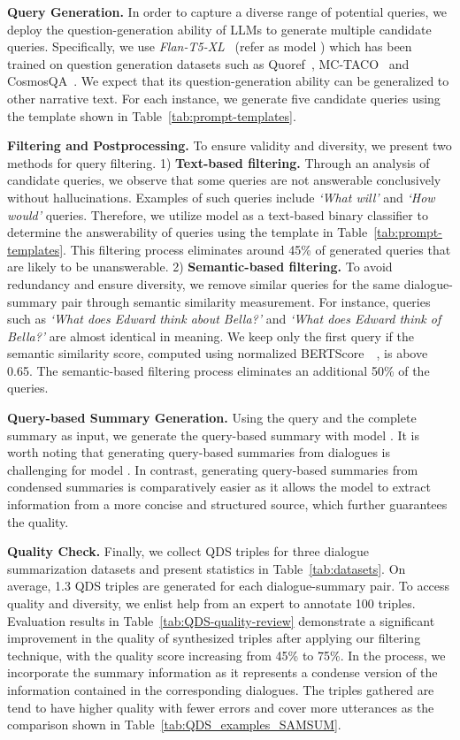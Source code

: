 \documentclass[11pt]{article}
\begin{document}
        \textbf{Query Generation.} In order to capture a diverse range of potential queries, we deploy the question-generation ability of LLMs to generate multiple candidate queries. Specifically, we use \emph{Flan-T5-XL}~\cite{chung2022scaling} (refer as model ) which has been trained on question generation datasets such as Quoref~\cite{dasigi-etal-2019-quoref}, MC-TACO~\cite{zhou-etal-2019-going} and CosmosQA~\cite{huang-etal-2019-cosmos}. We expect that its question-generation ability can be generalized to other narrative text. For each instance, we generate five candidate queries using the template shown in Table~\ref{tab:prompt-templates}.

        \textbf{Filtering and Postprocessing.} To ensure validity and diversity, we present two methods for query filtering. 1) \textbf{Text-based filtering.} Through an analysis of candidate queries, we observe that some queries are not answerable conclusively without hallucinations. Examples of such queries include \emph{`What will'} and \emph{`How would'} queries. Therefore, we utilize model  as a text-based binary classifier to determine the answerability of queries using the template in Table~\ref{tab:prompt-templates}. This filtering process eliminates around 45\% of generated queries that are likely to be unanswerable. 2) \textbf{Semantic-based filtering.} To avoid redundancy and ensure diversity, we remove similar queries for the same dialogue-summary pair through semantic similarity measurement. For instance, queries such as \emph{`What does Edward think about Bella?'} and \emph{`What does Edward think of Bella?'} are almost identical in meaning. We keep only the first query if the semantic similarity score, computed using normalized BERTScore~~\cite{bert-score}, is above 0.65. The semantic-based filtering process eliminates an additional 50\% of the queries.

        \textbf{Query-based Summary Generation.} Using the query and the complete summary as input, we generate the query-based summary with model . It is worth noting that generating query-based summaries from dialogues is challenging for model . In contrast, generating query-based summaries from condensed summaries is comparatively easier as it allows the model to extract information from a more concise and structured source, which further guarantees the quality.


        \textbf{Quality Check.} Finally, we collect QDS triples for three dialogue summarization datasets and present statistics in Table~\ref{tab:datasets}. On average, 1.3 QDS triples are generated for each dialogue-summary pair. To access quality and diversity, we enlist help from an expert to annotate 100 triples. Evaluation results in Table~\ref{tab:QDS-quality-review} demonstrate a significant improvement in the quality of synthesized triples after applying our filtering technique, with the quality score increasing from 45\% to 75\%. In the process, we incorporate the summary information as it represents a condense version of the information contained in the corresponding dialogues. The triples gathered are tend to have higher quality with fewer errors and cover more utterances as the comparison shown in Table~\ref{tab:QDS_examples_SAMSUM}.
        
\end{document}
